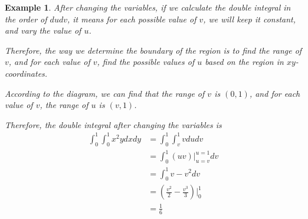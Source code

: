 \documentclass{article}
\newtheorem{example}{Example}
\begin{document}
\begin{example}
  After changing the variables, if we calculate the double integral in the order 
  of $du dv$, it means for each possible value of $v$, we will keep it constant, 
  and vary the value of $u$.

  Therefore, the way we determine the boundary of the region is to find the 
  range of $v$, and for each value of $v$, find the possible values of $u$ based 
  on the region in $xy$-coordinates.

  According to the diagram, we can find that the range of $v$ is $(0, 1)$, and 
  for each value of $v$, the range of $u$ is $(v, 1)$.

  Therefore, the double integral after changing the variables is
  \begin{equation*}
    \begin{split}
      \int_0^1 \int_0^1 x^2 y dx dy &= \int_0^1 \int_v^1 v du dv \\
                                    &= \int_0^1 (uv)|_{u = v}^{u = 1} dv \\
                                    &= \int_0^1 v - v^2 dv \\
                                    &= (\frac{v^2}{2} - \frac{v^3}{3})|_0^1 \\
                                    &= \frac{1}{6} \\
    \end{split}
  \end{equation*}
\end{example}
\end{document}
